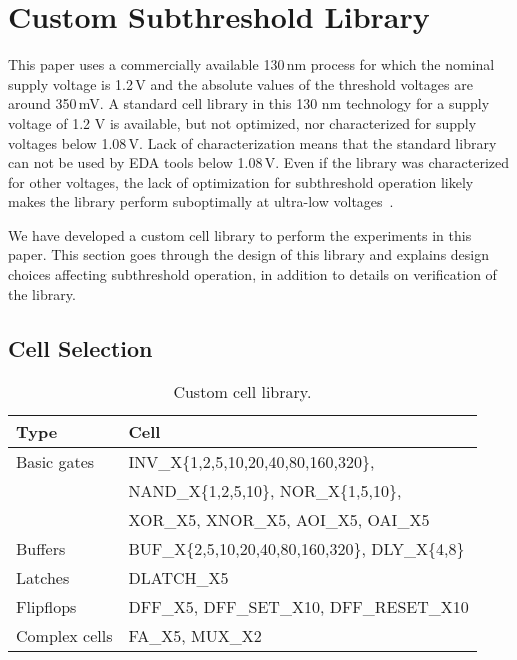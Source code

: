 \section{Custom Subthreshold Library}
\label{sec:bowilib}

This paper uses a commercially available 130\,nm process for which the nominal supply voltage is 1.2\,V and the absolute values of the threshold voltages are around 350\,mV.  A standard cell library in this 130 nm technology for a supply voltage of 1.2 V is available, but not optimized, nor characterized for supply voltages below 1.08\,V.
Lack of characterization means that the standard library can not be used by EDA tools below 1.08\,V.
Even if the library was characterized for other voltages, the lack of optimization for subthreshold operation likely makes the library perform suboptimally at ultra-low voltages~\cite{937856}.

We have developed a custom cell library to perform the experiments in this paper.
This section goes through the design of this library and explains design choices affecting subthreshold operation, in addition to details on verification of the library.
\subsection{Cell Selection}

\begin{table}[t]
  \centering
  \caption{Custom cell library.}
  \begin{tabular}[tp]{l|l}
    Type & Cell \\
    \hline
    \hline
    Basic gates & INV\_X\{1,2,5,10,20,40,80,160,320\}, \\
                & NAND\_X\{1,2,5,10\}, NOR\_X\{1,5,10\}, \\
                & XOR\_X5, XNOR\_X5, AOI\_X5, OAI\_X5 \\

    Buffers & BUF\_X\{2,5,10,20,40,80,160,320\}, DLY\_X\{4,8\} \\

    Latches & DLATCH\_X5 \\

    Flipflops & DFF\_X5, DFF\_SET\_X10, DFF\_RESET\_X10 \\

    Complex cells & FA\_X5, MUX\_X2 \\
  \end{tabular}
  \label{tab:bowilib}
\end{table}


